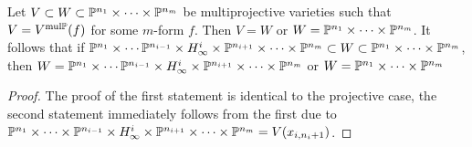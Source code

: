      \begin{lemma}
         Let $V\subset W \subset \mathbb{P}^{n_1}\times\cdots\times\mathbb{P}^{n_m}$ be multiprojective varieties such that $V=V^{\mathrm{mul}\mathbb{P}}(f)$ for some $m$-form $f$. Then $V=W$ or $W=\mathbb{P}^{n_1}\times \cdots\times \mathbb{P}^{n_m}$. It follows that if $\mathbb{P}^{n_1}\times\cdots\mathbb{P}^{n_{i-1}}\times H^i_\infty\times\mathbb{P}^{n_{i+1}}\times\cdots\times\mathbb{P}^{n_m}\subset W\subset \mathbb{P}^{n_1}\times\cdots\times\mathbb{P}^{n_m}$, then $W=\mathbb{P}^{n_1}\times\cdots\mathbb{P}^{n_{i-1}}\times H^i_\infty\times\mathbb{P}^{n_{i+1}}\times\cdots\times\mathbb{P}^{n_m}$ or $W=\mathbb{P}^{n_1}\times\cdots\times\mathbb{P}^{n_m}$
     \end{lemma}
     \begin{proof}
         The proof of the first statement is identical to the projective case, the second statement immediately follows from the first due to $\mathbb{P}^{n_1}\times \cdots \times \mathbb{P}^{n_{i-1}}\times H^i_\infty \times \mathbb{P}^{n_{i+1}}\times \cdots \times \mathbb{P}^{n_m}=V(x_{i,n_i+1})$. 
     \end{proof}
